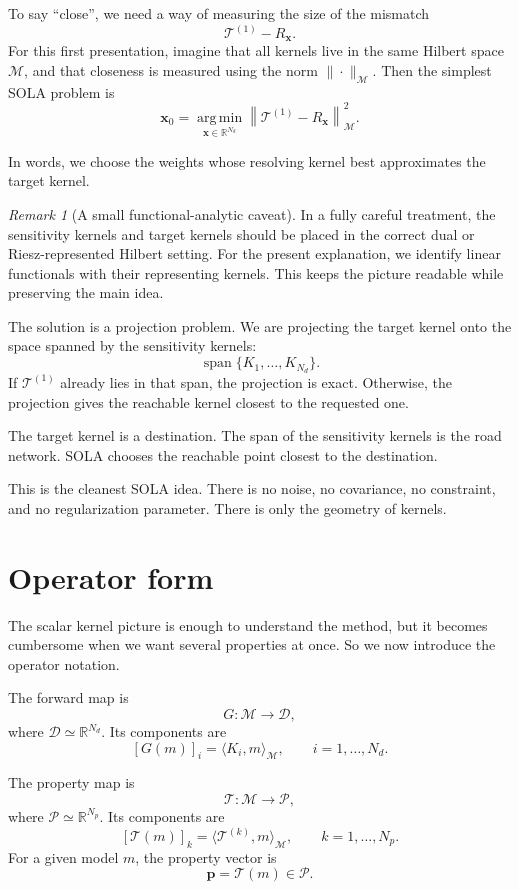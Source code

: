 \documentclass[11pt,openany]{book}
\theoremstyle{definition}
\theoremstyle{remark}
\newtheorem{remark}{Remark}[chapter]
\newcommand{\M}{\mathcal M}
\newcommand{\D}{\mathcal D}
\newcommand{\Pspace}{\mathcal P}
\newcommand{\Tau}{\mathcal{T}}
\newcommand{\spanop}{\operatorname{span}}
\newcommand{\argmin}{\operatorname*{arg\,min}}
\begin{document}
To say ``close'', we need a way of measuring the size of the mismatch
\[
  \Tau^{(1)}-R_{\mathbf x}.
\]
For this first presentation, imagine that all kernels live in the same Hilbert space \(\M\), and
that closeness is measured using the norm \(\|\cdot\|_{\M}\). Then the simplest SOLA problem is
\[
  \mathbf x_0
  =
  \argmin_{\mathbf x\in\mathbb R^{N_d}}
  \left\|
    \Tau^{(1)}-R_{\mathbf x}
  \right\|_{\M}^2.
\]

In words, we choose the weights whose resolving kernel best approximates the target kernel.

\begin{remark}[A small functional-analytic caveat]
In a fully careful treatment, the sensitivity kernels and target kernels should be placed in the
correct dual or Riesz-represented Hilbert setting. For the present explanation, we identify linear
functionals with their representing kernels. This keeps the picture readable while preserving the
main idea.
\end{remark}

The solution is a projection problem. We are projecting the target kernel onto the space spanned
by the sensitivity kernels:
\[
  \spanop\{K_1,\dots,K_{N_d}\}.
\]
If \(\Tau^{(1)}\) already lies in that span, the projection is exact. Otherwise, the projection gives
the reachable kernel closest to the requested one.

\begin{intuitionbox}
The target kernel is a destination. The span of the sensitivity kernels is the road network. SOLA
chooses the reachable point closest to the destination.
\end{intuitionbox}

This is the cleanest SOLA idea. There is no noise, no covariance, no constraint, and no
regularization parameter. There is only the geometry of kernels.

\section{Operator form}

The scalar kernel picture is enough to understand the method, but it becomes cumbersome when
we want several properties at once. So we now introduce the operator notation.

The forward map is
\[
  G:\M\to\D,
\]
where \(\D\simeq\mathbb R^{N_d}\). Its components are
\[
  [G(m)]_i
  =
  \langle K_i,m\rangle_{\M},
  \qquad i=1,\dots,N_d.
\]

The property map is
\[
  \Tau:\M\to\Pspace,
\]
where \(\Pspace\simeq\mathbb R^{N_p}\). Its components are
\[
  [\Tau(m)]_k
  =
  \langle \Tau^{(k)},m\rangle_{\M},
  \qquad k=1,\dots,N_p.
\]
For a given model \(m\), the property vector is
\[
  \mathbf p=\Tau(m)\in\Pspace.
\]
\end{document}

